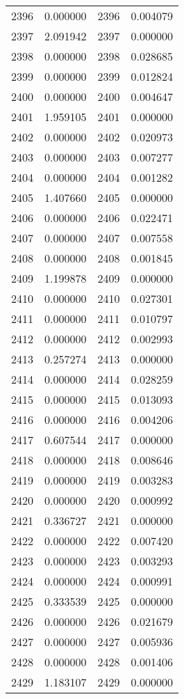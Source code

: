 \documentclass[12pt]{article}
\begin{document}
\begin{longtable}{@{}cccc@{}}
2396 & 0.000000 & 2396 & 0.004079 \\
2397 & 2.091942 & 2397 & 0.000000 \\
2398 & 0.000000 & 2398 & 0.028685 \\
2399 & 0.000000 & 2399 & 0.012824 \\
2400 & 0.000000 & 2400 & 0.004647 \\
2401 & 1.959105 & 2401 & 0.000000 \\
2402 & 0.000000 & 2402 & 0.020973 \\
2403 & 0.000000 & 2403 & 0.007277 \\
2404 & 0.000000 & 2404 & 0.001282 \\
2405 & 1.407660 & 2405 & 0.000000 \\
2406 & 0.000000 & 2406 & 0.022471 \\
2407 & 0.000000 & 2407 & 0.007558 \\
2408 & 0.000000 & 2408 & 0.001845 \\
2409 & 1.199878 & 2409 & 0.000000 \\
2410 & 0.000000 & 2410 & 0.027301 \\
2411 & 0.000000 & 2411 & 0.010797 \\
2412 & 0.000000 & 2412 & 0.002993 \\
2413 & 0.257274 & 2413 & 0.000000 \\
2414 & 0.000000 & 2414 & 0.028259 \\
2415 & 0.000000 & 2415 & 0.013093 \\
2416 & 0.000000 & 2416 & 0.004206 \\
2417 & 0.607544 & 2417 & 0.000000 \\
2418 & 0.000000 & 2418 & 0.008646 \\
2419 & 0.000000 & 2419 & 0.003283 \\
2420 & 0.000000 & 2420 & 0.000992 \\
2421 & 0.336727 & 2421 & 0.000000 \\
2422 & 0.000000 & 2422 & 0.007420 \\
2423 & 0.000000 & 2423 & 0.003293 \\
2424 & 0.000000 & 2424 & 0.000991 \\
2425 & 0.333539 & 2425 & 0.000000 \\
2426 & 0.000000 & 2426 & 0.021679 \\
2427 & 0.000000 & 2427 & 0.005936 \\
2428 & 0.000000 & 2428 & 0.001406 \\
2429 & 1.183107 & 2429 & 0.000000 \\

\end{longtable}
\end{document}
